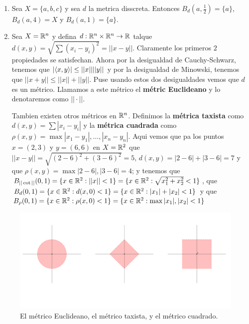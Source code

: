 \begin{example}
    \begin{enumerate}[label=(\arabic*)]
        \item Sea $X=\{a,b,c\}$ y sea $d$ la metrica disscreta. Entonces  $B_d(a,\frac{1}{2})=\{a\}$, 
        $B_d(a,4)=X$ y $B_d(a,1)=\{a\}$.

    \item Sea $X=\mathbb{R}^n$ y defina  $d:\mathbb{R}^n \times \mathbb{R}^n \rightarrow \mathbb{R}$ talque
        $d(x,y)=\sqrt{\sum{(x_i-y_i)^2}}=||x-y||$. Claramente los primeros $2$ propiedades se
        satisfechan. Ahora por la desigualdad de Cauchy-Schwarz, tenemos que  $|\langle x,y\rangle| \leq
        ||x||||y||$ y por la desigualdad de Minowski, tenemos que $||x+y|| \leq ||x||+||y||$. Puse
        usando estos dos desigualdades vemos que  $d$ es un m\'etrico. Llamamos a este m\'etrico el
        \textbf{m\'etric Euclideano} y lo denotaremos como $||\cdot||$.

        Tambien existen otros m\'etricos en  $\mathbb{R}^n$. Definimos la \textbf{m\'etrica taxista} como
        $d(x,y)=\sum{|x_i-y_i|}$ y la \textbf{m\'etrica cuadrada} como $\rho(x,y)=\max{|x_1-y_1|,
        \dots, |x_n-y_n|}$. Aqui vemos que pa los puntos $x=(2,3)$ y $y=(6,6)$ en $X=\mathbb{R}^2$ que
        $||x-y||=\sqrt{(2-6)^2+(3-6)^2}=5$, $d(x,y)=|2-6|+|3-6|=7$ y que
        $\rho(x,y)=\max{|2-6|,|3-6|}=4$; y tenemos que $B_{||\cot||}(0,1)=\{x \in \mathbb{R}^2:
        ||x||<1\}=\{x \in \mathbb{R}^2: \sqrt{x_1^2+x_2^2}<1\}$, que $B_d(0,1)=\{x \in \mathbb{R}^2: d(x,0)<1\}=\{x
    \in\mathbb{R}^2: |x_1|+|x_2|<1\}$ y que $B_{\rho}(0,1)=\{x \in \mathbb{R}^2:\rho(x,0)<1\}=\{x \in \mathbb{R}^2:
\max{|x_1|,|x_2|}<1\}$
    \end{enumerate} 		
\end{example} 

\begin{figure} 
    \centering
    \includegraphics[scale=0.4]{Figures/Chapter1/euclideanTaxicabSquare.png}
    \caption{El m\'etrico Euclideano, el m\'etrico taxista, y el m\'etrico cuadrado.}
    \label{fig_1.1}
\end{figure}

